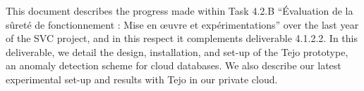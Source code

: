 This document describes the progress made within Task 4.2.B ``Évaluation de la sûreté de fonctionnement : Mise en œuvre et expérimentations''  over the last year of the SVC project,  and in this respect it complements
deliverable 4.1.2.2.  In this deliverable, we detail the design, installation, and set-up of the Tejo prototype, an anomaly detection scheme for cloud databases. We also describe our latest experimental set-up and results with Tejo in our private cloud.

